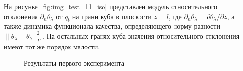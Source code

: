 \documentclass[12pt]{article}
\begin{document}
    На рисунке~\ref{fig:img_test_11_iso} представлен модуль относительного отклонения $\partial_n\theta_\lambda$ от $q_b$
    на грани куба в плоскости $z=l$, где $\partial_n\theta_\lambda=\partial\theta_\lambda/\partial z$,
    а также динамика функционала качества, определяющего норму разности $\|\theta_\lambda -\theta_b\|^2_\Gamma$.
    На остальных гранях куба значения относительного отклонения имеют тот же порядок малости.
    \begin{figure}[H]
        \centering
        \caption{Результаты первого эксперимента}
    \end{figure}
\end{document}
